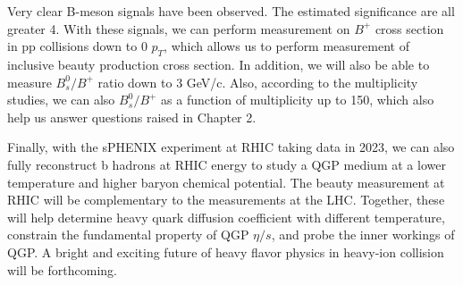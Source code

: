 Very clear B-meson signals have been observed. The estimated significance are all greater 4. With these signals, we can perform measurement on $B^+$ cross section in pp collisions down to 0 $p_T$, which allows us to perform measurement of inclusive beauty production cross section. In addition, we will also be able to measure $B^0_s/B^+$ ratio down to 3 GeV/c. Also, according to the multiplicity studies, we can also $B^0_s/B^+$ as a function of multiplicity up to 150, which also help us answer questions raised in Chapter 2. 

Finally, with the sPHENIX experiment at RHIC taking data in 2023, we can also fully reconstruct b hadrons at RHIC energy to study a QGP medium at a lower temperature and higher baryon chemical potential. The beauty measurement at RHIC will be complementary to the measurements at the LHC. Together, these will help determine heavy quark diffusion coefficient with different temperature, constrain the fundamental property of QGP $\eta/s$, and probe the inner workings of QGP. A bright and exciting future of heavy flavor physics in heavy-ion collision will be forthcoming.



